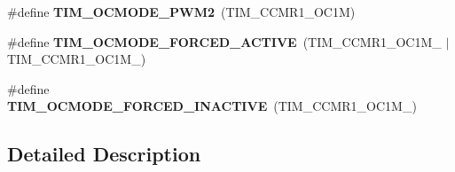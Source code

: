 \begin{DoxyCompactItemize}
\item 
\mbox{\label{group___t_i_m___output___compare__and___p_w_m__modes_ga88ce4251743c2c07e19fdd5a0a310580}} 
\#define {\bfseries T\+I\+M\+\_\+\+O\+C\+M\+O\+D\+E\+\_\+\+P\+W\+M2}~(T\+I\+M\+\_\+\+C\+C\+M\+R1\+\_\+\+O\+C1M)
\item 
\mbox{\label{group___t_i_m___output___compare__and___p_w_m__modes_ga0a78cecaf884a89963e2a8e6af7e6128}} 
\#define {\bfseries T\+I\+M\+\_\+\+O\+C\+M\+O\+D\+E\+\_\+\+F\+O\+R\+C\+E\+D\+\_\+\+A\+C\+T\+I\+VE}~(T\+I\+M\+\_\+\+C\+C\+M\+R1\+\_\+\+O\+C1\+M\+\_ $\vert$ T\+I\+M\+\_\+\+C\+C\+M\+R1\+\_\+\+O\+C1\+M\+\_)
\item 
\mbox{\label{group___t_i_m___output___compare__and___p_w_m__modes_ga4572f724ce30ce45557f1dc5141afb3e}} 
\#define {\bfseries T\+I\+M\+\_\+\+O\+C\+M\+O\+D\+E\+\_\+\+F\+O\+R\+C\+E\+D\+\_\+\+I\+N\+A\+C\+T\+I\+VE}~(T\+I\+M\+\_\+\+C\+C\+M\+R1\+\_\+\+O\+C1\+M\+\_)
\end{DoxyCompactItemize}


\subsection{Detailed Description}
